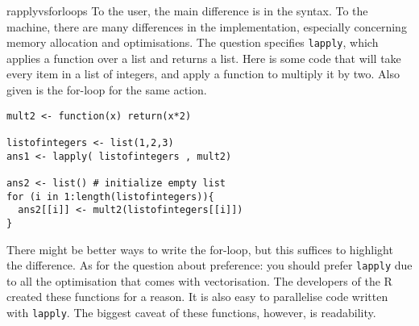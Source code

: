 \begin{answer}{rapplyvsforloops}
 To the user, the main difference is in the syntax.
 To the machine, there are many differences in the implementation, especially concerning memory allocation and optimisations.
 The question specifies \verb+lapply+, which applies a function over a list and returns a list.
 Here is some code that will take every item in a list of integers, and apply a function to multiply it by two.
 Also given is the for-loop for the same action.

\begin{verbatim}
mult2 <- function(x) return(x*2)

listofintegers <- list(1,2,3)
ans1 <- lapply( listofintegers , mult2)

ans2 <- list() # initialize empty list
for (i in 1:length(listofintegers)){
  ans2[[i]] <- mult2(listofintegers[[i]])
}
\end{verbatim}
There might be better ways to write the for-loop, but this suffices to highlight the difference.
As for the question about preference: you should prefer \verb+lapply+ due to all the optimisation that comes with vectorisation.
The developers of the R created these functions for a reason.
It is also easy to parallelise code written with \verb+lapply+.
The biggest caveat of these functions, however, is readability.
\end{answer}
